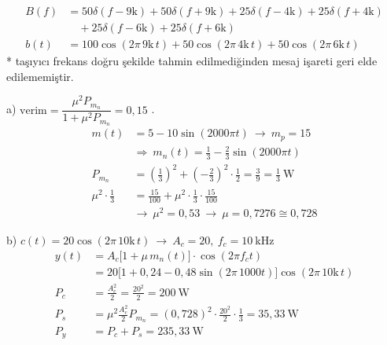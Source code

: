 \documentclass[11pt,a4paper]{article}
\begin{document}
\begin{align*}
B(f)&=50\delta(f-9\mathrm{k})+50\delta(f+9\mathrm{k})+25\delta(f-4\mathrm{k})+25\delta(f+4\mathrm{k})\\
&\quad+25\delta(f-6\mathrm{k})+25\delta(f+6\mathrm{k})\\
b(t)&=100\cos(2\pi\,9\mathrm{k}\,t)+50\cos(2\pi\,4\mathrm{k}\,t)+50\cos(2\pi\,6\mathrm{k}\,t)
\end{align*}
* taşıyıcı frekans doğru şekilde tahmin edilmediğinden mesaj işareti geri elde edilememiştir.


\noindent a) $\text{verim}=\dfrac{\mu^2P_{m_n}}{1+\mu^2P_{m_n}}=0{,}15$ .
\begin{align*}
m(t)&=5-10\sin(2000\pi t)\ \longrightarrow\ m_p=15\\
 &\Rightarrow\ m_n(t)=\frac13-\frac23\sin(2000\pi t)\\
P_{m_n}&=\left(\frac13\right)^2+\left(-\frac23\right)^2\cdot\frac12=\frac39=\frac13\ \mathrm{W}\\
\mu^2\cdot\frac13&=\frac{15}{100}+\mu^2\cdot\frac13\cdot\frac{15}{100}\\
 &\longrightarrow\ \mu^2=0{,}53\ \rightarrow\ \mu=0{,}7276\cong 0{,}728
\end{align*}

\noindent b) $c(t)=20\cos(2\pi\,10\mathrm{k}\,t)\ \longrightarrow\ A_c=20,\ f_c=10\ \mathrm{kHz}$
\begin{align*}
y(t)&=A_c\bigl[1+\mu\,m_n(t)\bigr]\cdot\cos(2\pi f_c t)\\
 &=20\bigl[1+0{,}24-0{,}48\sin(2\pi\,1000t)\bigr]\cos(2\pi\,10\mathrm{k}\,t)\\
P_c&=\frac{A_c^2}{2}=\frac{20^2}{2}=200\ \mathrm{W}\\
P_s&=\mu^2\frac{A_c^2}{2}P_{m_n}=(0{,}728)^2\cdot\frac{20^2}{2}\cdot\frac13=35{,}33\ \mathrm{W}\\
P_y&=P_c+P_s=235{,}33\ \mathrm{W}
\end{align*}
\end{document}
